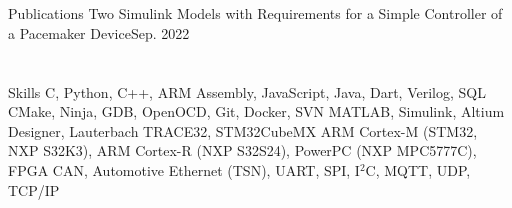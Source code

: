 \section{}{Publications\hspace{463pt}}
\resumeEntryStart
    \resumeEntryTD
      {Two Simulink Models with Requirements for a Simple Controller of a Pacemaker Device}{Sep. 2022}
      \resumeItemListStart
      \resumeItemListEnd
      \resumeEntryEnd
\section{}{Skills\hspace{500pt}}
 \resumeEntryStart
   {C, Python, C++, ARM Assembly, JavaScript, Java, Dart, Verilog, SQL}
   {CMake, Ninja, GDB, OpenOCD, Git, Docker, SVN}
   {MATLAB, Simulink, Altium Designer, Lauterbach TRACE32, STM32CubeMX}
   {ARM Cortex-M (STM32, NXP S32K3), ARM Cortex-R (NXP S32S24), PowerPC (NXP MPC5777C), FPGA}
   {CAN, Automotive Ethernet (TSN), UART, SPI, I$^2$C, MQTT, UDP, TCP/IP}
 \resumeEntryEnd
